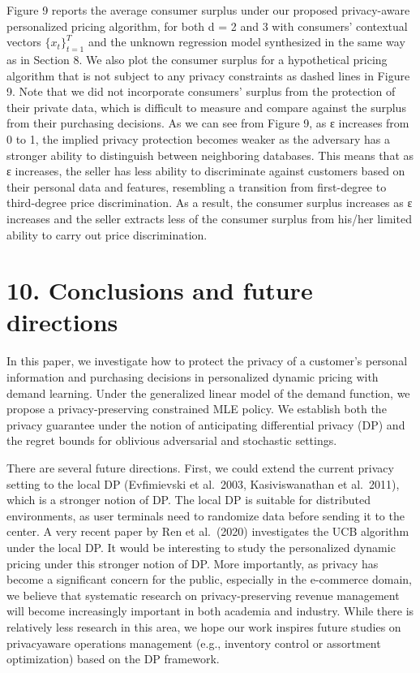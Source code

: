 Figure 9 reports the average consumer surplus under our proposed privacy-aware personalized pricing algorithm, for both d = 2 and 3 with consumers' contextual vectors \(\{ x _ { t } \} _ { t = 1 } ^ { T }\) and the unknown regression model synthesized in the same way as in Section 8. We also plot the consumer surplus for a hypothetical pricing algorithm that is not subject to any privacy constraints as dashed lines in Figure 9. Note that we did not incorporate consumers' surplus from the protection of their private data, which is difficult to measure and compare against the surplus from their purchasing decisions. As we can see from Figure 9, as ε increases from 0 to 1, the implied privacy protection becomes weaker as the adversary has a stronger ability to distinguish between neighboring databases. This means that as ε increases, the seller has less ability to discriminate against customers based on their personal data and features, resembling a transition from first-degree to third-degree price discrimination. As a result, the consumer surplus increases as ε increases and the seller extracts less of the consumer surplus from his/her limited ability to carry out price discrimination.

\section{10. Conclusions and future directions}\label{conclusions-and-future-directions}

In this paper, we investigate how to protect the privacy of a customer's personal information and purchasing decisions in personalized dynamic pricing with demand learning. Under the generalized linear model of the demand function, we propose a privacy-preserving constrained MLE policy. We establish both the privacy guarantee under the notion of anticipating differential privacy (DP) and the regret bounds for oblivious adversarial and stochastic settings.

There are several future directions. First, we could extend the current privacy setting to the local DP (Evfimievski et al.~2003, Kasiviswanathan et al.~2011), which is a stronger notion of DP. The local DP is suitable for distributed environments, as user terminals need to randomize data before sending it to the center. A very recent paper by Ren et al.~(2020) investigates the UCB algorithm under the local DP. It would be interesting to study the personalized dynamic pricing under this stronger notion of DP. More importantly, as privacy has become a significant concern for the public, especially in the e-commerce domain, we believe that systematic research on privacy-preserving revenue management will become increasingly important in both academia and industry. While there is relatively less research in this area, we hope our work inspires future studies on privacyaware operations management (e.g., inventory control or assortment optimization) based on the DP framework.

